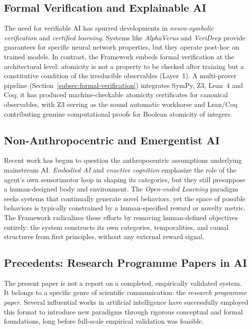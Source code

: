 \subsection{Formal Verification and Explainable AI}
The need for verifiable AI has spurred developments in \textit{neuro-symbolic verification} and \textit{certified learning}. Systems like \textit{AlphaVerus} \cite{wang2023} and \textit{VeriDeep} \cite{chen2024} provide guarantees for specific neural network properties, but they operate post-hoc on trained models. In contrast, the \Apeiron{} Framework embeds formal verification at the
architectural level: atomicity is not a property to be checked after
training but a constitutive condition of the irreducible observables
(Layer~1).  A multi-prover pipeline (Section~\ref{subsec:formal-verification})
integrates SymPy, Z3, Lean~4 and Coq; it has produced machine-checkable
atomicity certificates for canonical observables, with Z3 serving as the
sound automatic workhorse and Lean/Coq contributing genuine computational
proofs for Boolean atomicity of integers.

\subsection{Non-Anthropocentric and Emergentist AI}
Recent work has begun to question the anthropocentric assumptions underlying mainstream AI. \textit{Embodied AI} and \textit{enactive cognition} \cite{thompson2007} emphasize the role of the agent's own sensorimotor loop in shaping its categories, but they still presuppose a human-designed body and environment. The \textit{Open-ended Learning} paradigm \cite{stanley2019} seeks systems that continually generate novel behaviors, yet the space of possible behaviors is typically constrained by a human-specified reward or novelty metric. The \Apeiron{} Framework radicalizes these efforts by removing human-defined objectives entirely: the system constructs its own categories, temporalities, and causal structures from first principles, without any external reward signal.

\subsection{Precedents: Research Programme Papers in AI}
\label{subsec:precedents}

The present paper is not a report on a completed, empirically validated system. It belongs to a specific genre of scientific communication: the \emph{research programme paper}. Several influential works in artificial intelligence have successfully employed this format to introduce new paradigms through rigorous conceptual and formal foundations, long before full-scale empirical validation was feasible.

